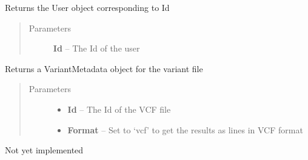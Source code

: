 \documentclass[letterpaper,10pt,english]{sphinxmanual}
\begin{document}
\begin{fulllineitems}
\begin{fulllineitems}
\end{fulllineitems}


\begin{fulllineitems}
\label{Available modules:BaseSpacePy.api.BaseSpaceAPI.BaseSpaceAPI.getUserById}
Returns the User object corresponding to Id
\begin{quote}\begin{description}
\item[{Parameters}] \leavevmode
\textbf{Id} -- The Id of the user

\end{description}\end{quote}

\end{fulllineitems}


\begin{fulllineitems}
\label{Available modules:BaseSpacePy.api.BaseSpaceAPI.BaseSpaceAPI.getVariantMetadata}
Returns a VariantMetadata object for the variant file
\begin{quote}\begin{description}
\item[{Parameters}] \leavevmode\begin{itemize}
\item {} 
\textbf{Id} -- The Id of the VCF file

\item {} 
\textbf{Format} -- Set to `vcf' to get the results as lines in VCF format

\end{itemize}

\end{description}\end{quote}

\end{fulllineitems}


\begin{fulllineitems}
\label{Available modules:BaseSpacePy.api.BaseSpaceAPI.BaseSpaceAPI.largeFileDownload}
Not yet implemented


\end{fulllineitems}
\end{fulllineitems}
\end{document}
